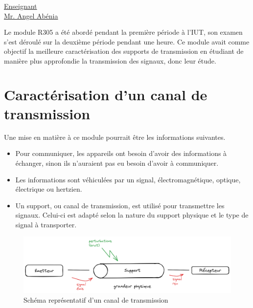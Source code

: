 \renewcommand{\figurename}{}

\vspace*{0.2cm}%
      \large
      \href{\@orientadorPagina}{\color{black}Enseignant\\Mr. Angel Abénia}\\%
\vspace*{0.5cm}%

Le module R305 a été abordé pendant la première période à l'IUT, son examen s'est déroulé sur la deuxième période pendant une heure. Ce module avait comme objectif la meilleure caractérisation des supports de transmission en étudiant de manière plus approfondie la transmission des signaux, donc leur étude.

\section{Caractérisation d'un canal de transmission}

Une mise en matière à ce module pourrait être les informations suivantes.
\begin{itemize}
  \item Pour communiquer, les appareils ont besoin d'avoir des informations à échanger, sinon ils n'auraient pas eu besoin d'avoir à communiquer.
  \item Les informations sont véhiculées par un signal, électromagnétique, optique, électrique ou hertzien.
  \item Un support, ou canal de transmission, est utilisé pour transmettre les signaux. Celui-ci est adapté selon la nature du support physique et le type de signal à transporter.
\end{itemize}

\begin{figure}[h]
    \centering
    \includegraphics[width=1\linewidth]{imgs/support.png}
    \caption{Schéma représentatif d'un canal de transmission}
    \label{fig:canal}
\end{figure}

